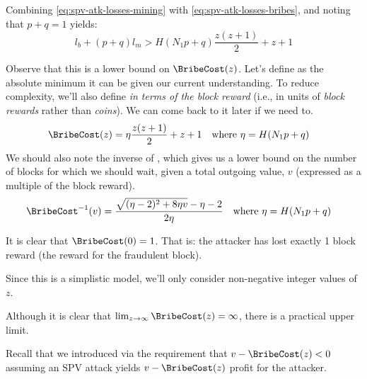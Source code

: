 
Combining \autoref{eq:spv-atk-losses-mining} with \autoref{eq:spv-atk-losses-bribes}, and noting that $p+q=1$ yields:
\begin{equation}
    l_b + (p+q)l_m > H (N_1 p + q) \frac{z(z+1)}{2} + z + 1
    \label{eq:spv-atk-losses-total}
\end{equation}


Observe that this is a lower bound on $\BribeCost(z)$.
Let's define \BribeCost as the absolute minimum it can be given our current understanding.
To reduce complexity, we'll also define \BribeCost \emph{in terms of the block reward} (i.e., in units of \emph{block rewards} rather than \emph{coins}).
We can come back to it later if we need to.
\begin{align}
    \BribeCost(z) &= \eta \frac{z(z+1)}{2} + z + 1
        & & \text{where } \eta = H(N_1 p + q)
    \label{eq:spv-bribe-cost-1}
\end{align}
We should also note the inverse of \BribeCost, which gives us a lower bound on the number of blocks for which we should wait, given a total outgoing value, $v$ (expressed as a multiple of the block reward).
\begin{align}
    \BribeCost^{-1}(v) &= \frac{\sqrt{
        (\eta - 2)^2 + 8 \eta v
    } - \eta - 2}{2\eta} & & \text{where } \eta = H(N_1 p + q)
    \label{eq:spv-bribe-cost-inverse}
\end{align}


It is clear that $\BribeCost(0) = 1$.
That is: the attacker has lost exactly 1 block reward (the reward for the fraudulent block).

Since this is a simplistic model, we'll only consider non-negative integer values of $z$.

Although it is clear that $\lim_{z \to \infty} \BribeCost(z) = \infty$, there is a practical upper limit.

Recall that we introduced \BribeCost via the requirement that $v - \BribeCost(z) < 0$ assuming an SPV attack yields $v - \BribeCost(z)$ profit for the attacker.

